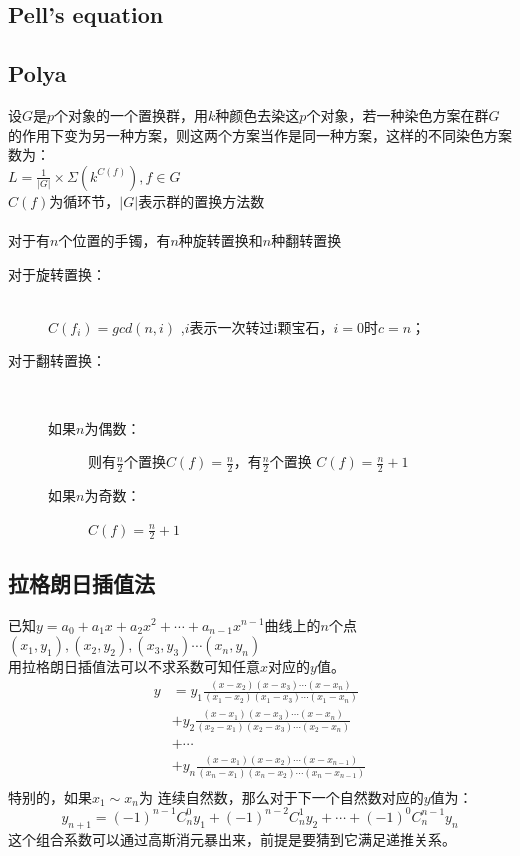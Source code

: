 \subsection{Pell's equation}


\subsection{Polya}
	设$G$是$p$个对象的一个置换群，用$k$种颜色去染这$p$个对象，若一种染色方案在群$G$的作用下变为另一种方案，则这两个方案当作是同一种方案，这样的不同染色方案数为：\\
	$L=\frac{1}{\left |G  \right |}\times \Sigma(k^{C(f)}), f\in G$\\
	$C(f)$为循环节，$\left |G  \right |$表示群的置换方法数\\
	\\
	对于有$n$个位置的手镯，有$n$种旋转置换和$n$种翻转置换
	\begin{description}
		\item[对于旋转置换：] ~\\
		$C(f_i)=gcd(n,i)$ ,$i$表示一次转过i颗宝石，$i=0$时$c=n$；\\
		\item[对于翻转置换：] ~\\
		\begin{description}
			\item[如果$n$为偶数：] 则有$\frac{n}{2}$个置换$C(f)=\frac{n}{2}$，有$\frac{n}{2}$个置换 $C(f)=\frac{n}{2}+1$\\
			\item[如果$n$为奇数：] $C(f)=\frac{n}{2}+1$\\
		\end{description}
	\end{description}
	\subsection{拉格朗日插值法}
	已知$y=a_0+a_1x+a_2x^2+\cdots +a_{n-1}x^{n-1}$曲线上的$n$个点$(x_1,y_1),(x_2,y_2),(x_3,y_3)\cdots (x_n,y_n)$\\
	用拉格朗日插值法可以不求系数可知任意$x$对应的$y$值。\\
	\[ \begin{split}
	y &= y_1\frac{(x-x_2)(x-x_3)\cdots (x-x_n)}{(x_1-x_2)(x_1-x_3)\cdots (x_1-x_n)}\\
	&+ y_2\frac{(x-x_1)(x-x_3)\cdots (x-x_n)}{(x_2-x_1)(x_2-x_3)\cdots (x_2-x_n)}\\
	&+ \cdots \\
	&+ y_n\frac{(x-x_1)(x-x_2)\cdots (x-x_{n-1})}{(x_n-x_1)(x_n-x_2)\cdots (x_n-x_{n-1})}\\
	\end{split}\]
	特别的，如果$x_1\sim x_n$为 连续自然数，那么对于下一个自然数对应的$y$值为：\\
	\[y_{n+1}=(-1)^{n-1}C_n^0y_1+(-1)^{n-2}C_n^1y_2+\cdots +(-1)^0C_n^{n-1}y_n\]
	这个组合系数可以通过高斯消元暴出来，前提是要猜到它满足递推关系。\\
	
